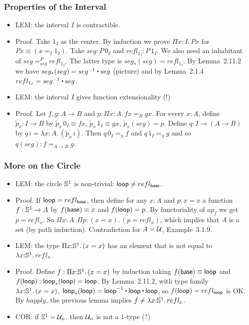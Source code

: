 \documentclass[handout]{beamer}
\newcommand{\depi}[3]{\Pi{#1{:}#2.\,#3}}
\newcommand{\lamt}[3]{\lambda{#1{:}#2.\,#3}}
\newcommand{\UU}{{\cal U}}
\newcommand{\ct}{%
  \mathchoice{\mathbin{\raisebox{0.5ex}{$\displaystyle\centerdot$}}}%
             {\mathbin{\raisebox{0.5ex}{$\centerdot$}}}%
             {\mathbin{\raisebox{0.25ex}{$\scriptstyle\,\centerdot\,$}}}%
             {\mathbin{\raisebox{0.1ex}{$\scriptscriptstyle\,\centerdot\,$}}}
}
\begin{document}
 \frame
  {
    \frametitle{Properties of the Interval}
    
\begin{itemize}    
    \item LEM: the interval $I$ is contractible.
    \item Proof. Take $1_I$ as the center. By induction we prove $\depi{x}{I}{Px}$
    for $Px \equiv (x =_I 1_I)$. Take $seg : P\,0_I$ and $refl_{1_I} : P\,1_I$.
    We also need an inhabitant of $seg =^P_{seg} refl_{1_I}$. 
    The latter type is $seg_*(seg) = refl_{1_I} $.
    By Lemma~2.11.2 we have  $seg_*(seg) = seg^{-1}\ct seg$ (picture) and 
    by Lemma~2.1.4 $refl_{1_I}  = seg^{-1}\ct seg$.    
    \item LEM: the interval $I$ gives function extensionality (!)
    \item Proof. Let $f,g: A\to B$ and $p:\depi{x}{A}{fx =_B gx}$. For every $x:A$,
    define $\tilde{p}_x : I \to B$ by $\tilde{p}_x\,0_I \equiv fx$, 
    $\tilde{p}_x\,1_I \equiv gx$, $\tilde{p}_x(seg) = p$. 
    Define $q: I \to (A\to B)$ by $q\,i=\lamt{x}{A}{(\tilde{p}_x\,i)}$.
    Then $q\,0_I =_\eta f$ and  $q\,1_I =_\eta g$ and so $q(seg): f=_{A\to B}g$.
 \end{itemize}
  }
  
                     
  \frame
  {
    \frametitle{More on the Circle}
    
\begin{itemize}    
    \item LEM: the circle $\mathbb{S}^1$ is non-trivial: $\mathsf{loop} \neq refl_{\mathsf{base}}$.
    \item Proof. If $\mathsf{loop} = refl_{\mathsf{base}}$, then define for any $x:A$ and $p: x=x$
    a function $f:\mathbb{S}^1\to A$ by $f(\mathsf{base})\equiv x$ and $f(\mathsf{loop}) = p$.
    By functoriality of $ap_f$ we get $p=refl_x$. 
    So $\depi{x}{A}{\depi{p}{(x=x)}{(p=refl_x)}}$,
    which implies that $A$ is a set (by path induction).
    Contradiction for $A=\UU$, Example~3.1.9.
    \item LEM: the type $\depi{x}{\Sn^1}{(x=x)}$ has an element 
    that is not equal to $\lamt{x}{\Sn^1}{refl_x}$.
    \item Proof. Define $f:\depi{x}{\Sn^1}{(x=x)}$ by induction
    taking $f(\mathsf{base})\equiv \mathsf{loop}$ and $f(\mathsf{loop}): \mathsf{loop}_*(\mathsf{loop}) = \mathsf{loop}$.
    By Lemma~2.11.2, with type family $\lamt{x}{\Sn^1}{(x=x)}$,
    $\lloop_*(\lloop)= \lloop^{-1}\ct \lloop\ct \lloop$,
    so $f(\mathsf{loop}) = refl_{\mathsf{loop}}$ is OK.
    By  $happly$, the previous lemma implies $f\neq\lamt{x}{\Sn^1}{refl_x}$.
    \item COR: if $\Sn^1= \UU_n$, then $\UU_n$ is not a 1-type (?)
    
 \end{itemize}
  }
\end{document}
